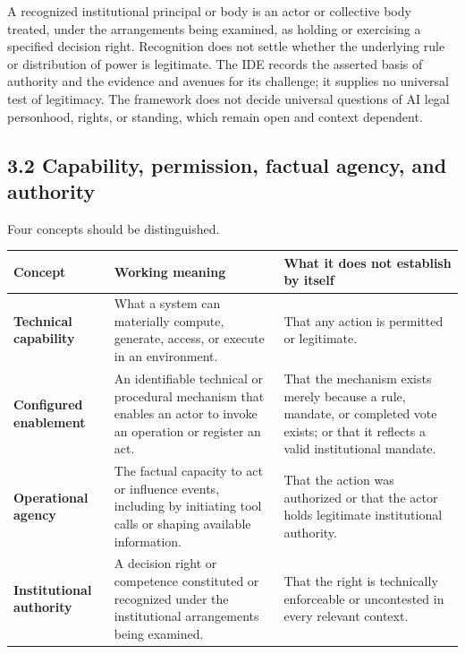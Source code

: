 \documentclass[
  10pt,
]{article}
\newcounter{none} %
\begin{document}
A recognized institutional principal or body is an actor or collective
body treated, under the arrangements being examined, as holding or
exercising a specified decision right. Recognition does not settle
whether the underlying rule or distribution of power is legitimate. The
IDE records the asserted basis of authority and the evidence and avenues
for its challenge; it supplies no universal test of legitimacy. The
framework does not decide universal questions of AI legal personhood,
rights, or standing, which remain open and context dependent.

\subsection{3.2 Capability, permission, factual agency, and
authority}\label{capability-permission-factual-agency-and-authority}

Four concepts should be distinguished.

{\def\LTcaptype{none} %
\setlength{\parskip}{0pt}\begin{longtable}[]{@{}
  >{\raggedright\arraybackslash}p{}
  >{\raggedright\arraybackslash}p{}
  >{\raggedright\arraybackslash}p{}@{}}
\toprule\noalign{}
Concept & Working meaning & What it does not establish by itself \\
\midrule\noalign{}
\endhead
\bottomrule\noalign{}
\endlastfoot
\textbf{Technical capability} & What a system can materially compute,
generate, access, or execute in an environment. & That any action is
permitted or legitimate. \\
\textbf{Configured enablement} & An identifiable technical or procedural
mechanism that enables an actor to invoke an operation or register an
act. & That the mechanism exists merely because a rule, mandate, or
completed vote exists; or that it reflects a valid institutional
mandate. \\
\textbf{Operational agency} & The factual capacity to act or influence
events, including by initiating tool calls or shaping available
information. & That the action was authorized or that the actor holds
legitimate institutional authority. \\
\textbf{Institutional authority} & A decision right or competence
constituted or recognized under the institutional arrangements being
examined. & That the right is technically enforceable or uncontested in
every relevant context. \\
\end{longtable}
}
\end{document}
